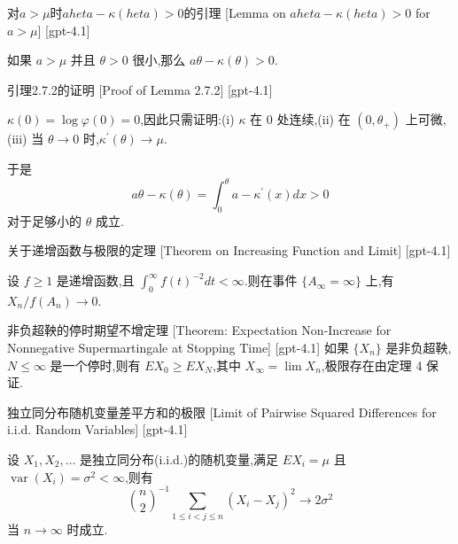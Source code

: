 \documentclass[UTF8]{ctexart}
\begin{document}
    
    
    \begin{lma}
        {对$a>\mu$时$a	heta-\kappa(	heta)>0$的引理}
        [Lemma on $a	heta-\kappa(	heta)>0$ for $a>\mu$]
        [gpt-4.1]
        
如果 $a > \mu$ 并且 $\theta > 0$ 很小,那么 $a \theta - \kappa( \theta ) > 0$.

    \end{lma}
    
    
    
    \begin{prf}
        {引理2.7.2的证明}
        [Proof of Lemma 2.7.2]
        [gpt-4.1]
        
$\kappa( 0 ) = \log \varphi( 0 ) = 0$,因此只需证明:(i) $\kappa$ 在 0 处连续,(ii) 在 $( 0 , \theta_{+} )$ 上可微,(iii) 当 $\theta \to 0$ 时,$\kappa^{\prime} ( \theta ) \to \mu$.

于是
\[
a \theta - \kappa ( \theta ) = \int_{0}^{\theta} a - \kappa^{\prime} ( x ) dx > 0
\]
对于足够小的 $\theta$ 成立.

    \end{prf}
    
    
    
    \begin{thm}
        {关于递增函数与极限的定理}
        [Theorem on Increasing Function and Limit]
        [gpt-4.1]
        
设 $f \geq 1$ 是递增函数,且 $\int_{0}^{\infty} f(t)^{-2} dt < \infty$.则在事件 $\{A_{\infty} = \infty\}$ 上,有 $X_n / f(A_n) \to 0$.

    \end{thm}
    
    
    
    \begin{thm}
        {非负超鞅的停时期望不增定理}
        [Theorem: Expectation Non-Increase for Nonnegative Supermartingale at Stopping Time]
        [gpt-4.1]
        如果 $\{X_{n}\}$ 是非负超鞅,$N \leq \infty$ 是一个停时,则有 $E X_{0} \geq E X_{N}$,其中 $X_{\infty} = \lim X_{n}$,极限存在由定理 4 保证.
    \end{thm}
    
    
    
    \begin{crl}
        {独立同分布随机变量差平方和的极限}
        [Limit of Pairwise Squared Differences for i.i.d. Random Variables]
        [gpt-4.1]
        
设 $X_{1}, X_{2}, \dots$ 是独立同分布(i.i.d.)的随机变量,满足 $E X_{i} = \mu$ 且 $\operatorname{var}(X_{i}) = \sigma^{2} < \infty$,则有
\[
\binom{n}{2}^{-1} \sum_{1 \leq i < j \leq n} (X_{i} - X_{j})^{2} \to 2 \sigma^{2}
\]
当 $n \to \infty$ 时成立.

    \end{crl}
    
\end{document}
